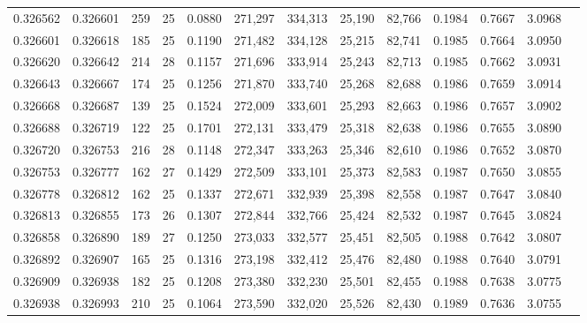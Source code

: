 \begin{tabular}{rrrrrrrrrrrrr}
0.326562 & 0.326601 &   259 &  25 &                                     0.0880 & 271,297 & 334,313 &  25,190 &  82,766 & 0.1984 & 0.7667 & 3.0968 \\
0.326601 & 0.326618 &   185 &  25 &                                     0.1190 & 271,482 & 334,128 &  25,215 &  82,741 & 0.1985 & 0.7664 & 3.0950 \\
0.326620 & 0.326642 &   214 &  28 &                                     0.1157 & 271,696 & 333,914 &  25,243 &  82,713 & 0.1985 & 0.7662 & 3.0931 \\
0.326643 & 0.326667 &   174 &  25 &                                     0.1256 & 271,870 & 333,740 &  25,268 &  82,688 & 0.1986 & 0.7659 & 3.0914 \\
0.326668 & 0.326687 &   139 &  25 &                                     0.1524 & 272,009 & 333,601 &  25,293 &  82,663 & 0.1986 & 0.7657 & 3.0902 \\
0.326688 & 0.326719 &   122 &  25 &                                     0.1701 & 272,131 & 333,479 &  25,318 &  82,638 & 0.1986 & 0.7655 & 3.0890 \\
0.326720 & 0.326753 &   216 &  28 &                                     0.1148 & 272,347 & 333,263 &  25,346 &  82,610 & 0.1986 & 0.7652 & 3.0870 \\
0.326753 & 0.326777 &   162 &  27 &                                     0.1429 & 272,509 & 333,101 &  25,373 &  82,583 & 0.1987 & 0.7650 & 3.0855 \\
0.326778 & 0.326812 &   162 &  25 &                                     0.1337 & 272,671 & 332,939 &  25,398 &  82,558 & 0.1987 & 0.7647 & 3.0840 \\
0.326813 & 0.326855 &   173 &  26 &                                     0.1307 & 272,844 & 332,766 &  25,424 &  82,532 & 0.1987 & 0.7645 & 3.0824 \\
0.326858 & 0.326890 &   189 &  27 &                                     0.1250 & 273,033 & 332,577 &  25,451 &  82,505 & 0.1988 & 0.7642 & 3.0807 \\
0.326892 & 0.326907 &   165 &  25 &                                     0.1316 & 273,198 & 332,412 &  25,476 &  82,480 & 0.1988 & 0.7640 & 3.0791 \\
0.326909 & 0.326938 &   182 &  25 &                                     0.1208 & 273,380 & 332,230 &  25,501 &  82,455 & 0.1988 & 0.7638 & 3.0775 \\
0.326938 & 0.326993 &   210 &  25 &                                     0.1064 & 273,590 & 332,020 &  25,526 &  82,430 & 0.1989 & 0.7636 & 3.0755 \\

\end{tabular}
